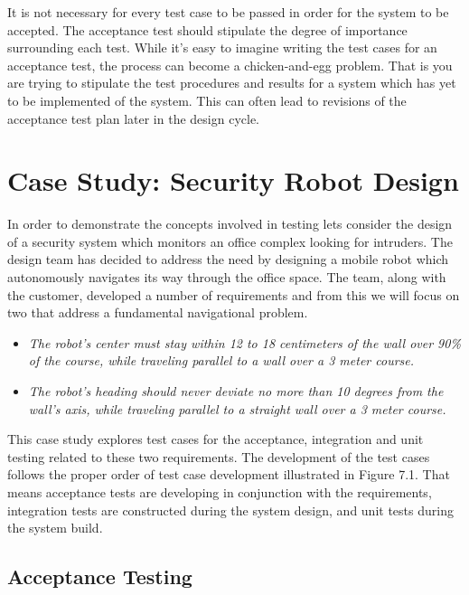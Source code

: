It is not necessary for every test case to be passed in order for the
system to be accepted. The acceptance test should stipulate the degree
of importance surrounding each test. While it's easy to imagine writing
the test cases for an acceptance test, the process can become a
chicken-and-egg problem. That is you are trying to stipulate the test
procedures and results for a system which has yet to be implemented of
the system. This can often lead to revisions of the acceptance test plan
later in the design cycle.

\section{Case Study: Security Robot Design}
\label{section:case-study-security-robot-design}

In order to demonstrate the concepts involved in testing lets consider
the design of a security system which monitors an office complex looking
for intruders. The design team has decided to address the need by
designing a mobile robot which autonomously navigates its way through
the office space. The team, along with the customer, developed a number
of requirements and from this we will focus on two that address a
fundamental navigational problem.

\begin{itemize}
\item
  \emph{The robot's center must stay within 12 to 18 centimeters of the
  wall over 90\% of the course, while traveling parallel to a wall over
  a 3 meter course.}
\item
  \emph{The robot's heading should never deviate no more than 10 degrees
  from the wall's axis, while traveling parallel to a straight wall over
  a 3 meter course.}
\end{itemize}

This case study explores test cases for the acceptance, integration and
unit testing related to these two requirements. The development of the
test cases follows the proper order of test case development illustrated
in Figure 7.1. That means acceptance tests are developing in conjunction
with the requirements, integration tests are constructed during the
system design, and unit tests during the system build.

\subsection*{Acceptance Testing}
\label{subsection:acceptance-testing-1}


